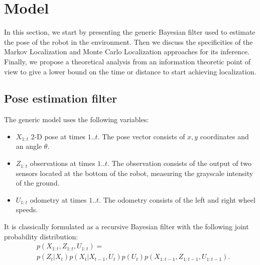 \documentclass[letterpaper, 10pt, conference]{ieeeconf}
\begin{document}
\section{Model}


In this section, we start by presenting the generic Bayesian filter used to estimate the pose of the robot in the environment.
Then we discuss the specificities of the Markov Localization and Monte Carlo Localization approaches for its inference.
Finally, we propose a theoretical analysis from an information theoretic point of view to give a lower bound on the time or distance to start achieving localization.

\subsection{Pose estimation filter}

The generic model uses the following variables:
\begin{itemize}
\item $X_{1:t}$ 2-D pose at times $1..t$.
The pose vector consists of $x,y$ coordinates and an angle $\theta$.
\item $Z_{1:t}$ observations at times $1..t$.
The observation consists of the output of two sensors located at the bottom of the robot, measuring the grayscale intensity of the ground.
\item $U_{1:t}$ odometry at times $1..t$.
The odometry consists of the left and right wheel speeds.
\end{itemize}

It is classically formulated as a recursive Bayesian filter with the following joint probability distribution:
\begin{equation*}
\begin{split}
& p(X_{1:t}, Z_{1:t}, U_{1:t}) = \\
& p(Z_t|X_t) p(X_t|X_{t-1}, U_{t}) p(U_t) p(X_{1:t-1}, Z_{1:t-1}, U_{1:t-1}).
\end{split}
\end{equation*}
\end{document}
